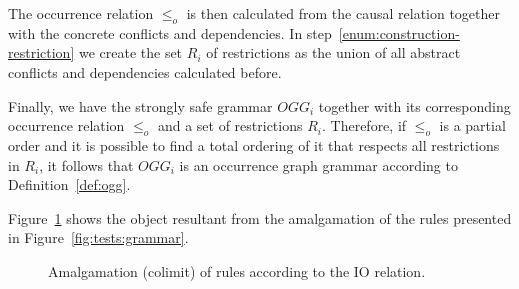 The occurrence relation $\leq_o$ is then calculated from the causal relation together with the concrete conflicts and dependencies. In step~\ref{enum:construction-restriction} we create the set $R_i$ of restrictions as the union of all abstract conflicts and dependencies calculated before.

Finally, we have the strongly safe grammar $OGG_i$ together with its corresponding occurrence relation $\leq_o$ and a set of restrictions $R_i$. Therefore, if $\leq_o$ is a partial order and it is possible to find a total ordering of it that respects all restrictions in $R_i$, it follows that $OGG_i$ is an occurrence graph grammar according to Definition~\ref{def:ogg}.


\begin{example}
\end{example}


\begin{example}\label{ex:amalgamation} Figure~\ref{fig:tests:colimit} shows the object resultant from the amalgamation of the rules presented in Figure~\ref{fig:tests:grammar}.

\begin{figure}[!ht]
  \centering
  \caption{Amalgamation (colimit) of rules according to the IO relation.}\label{fig:tests:colimit}
\end{figure}
\end{example}

